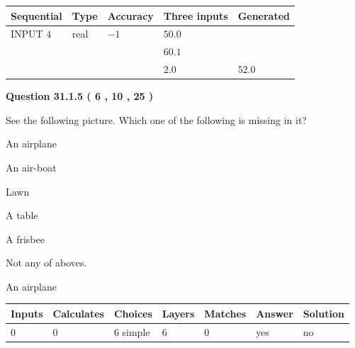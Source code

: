 \documentclass[12pt]{article}
\begin{document}
   
  
  
\noindent\begin{tabular}{|l|l|l|l|l|}
\hline
 Sequential & Type & Accuracy & Three inputs & Generated \\ 
\hline
 
 
  INPUT $            4 $ & real & $           -1  $ & $
 50.0
  $ & \\
  & & &  $
 60.1
  $ & \\
  & & &  $
 2.0
 $ & $ 52.0 $ 
 \\  \hline  
 \end{tabular}
   
   
  
\vspace{0.2in}
  
{\textbf{\Large{Question
31.1.5 
 (           6 ,          10 ,          25 )
}}}
  
  
See the following picture.
Which one of the following is missing in it?
 
 
An airplane
 
 
An air-boat
 
 
Lawn
 
 
A table
 
 
A frisbee
 
 
  Not any of aboves.
 
 
\noindent{}
 
 
An airplane
 
 
\noindent{}
 
 
 
\vspace{0.3in}
   
   
   
   
\noindent\begin{tabular}{|l|l|l|l|l|l|l|}
 \hline
Inputs & Calculates & Choices & Layers & Matches & Answer & Solution \\ \hline
           0  & 
           0  & 
           6
  simple  
  & 
           6  & 
           0  & 
  yes & 
  no 
  \\ \hline
 \end{tabular}
   
\end{document}
